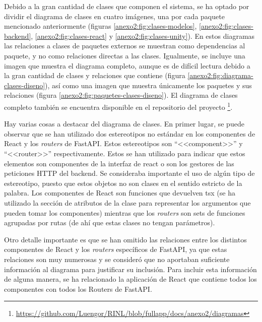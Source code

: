 Debido a la gran cantidad de clases que componen el sistema, se ha optado por dividir el diagrama
de clases en cuatro imágenes, una por cada paquete mencionado anteriormente (figuras
\ref{anexo2:fig:clases-modelos}, \ref{anexo2:fig:clases-backend},
 \ref{anexo2:fig:clases-react} y \ref{anexo2:fig:clases-unity}). En estos diagramas
las relaciones a clases de paquetes externos se muestran como dependencias al paquete, y no
como relaciones directas a las clases. Igualmente, se incluye una imagen que muestra
el diagrama completo, aunque es de difícil lectura debido a la gran cantidad de clases
y relaciones que contiene (figura \ref{anexo2:fig:diagrama-clases-diseno}), así como
una imagen que muestra únicamente los paquetes y sus relaciones
(figura \ref{anexo2:fig:paquetes-clases-diseno}). El diagrama de clases completo
también se encuentra disponible en el repositorio del proyecto%
\footnote{\url{https://github.com/Luengor/RINL/blob/fullapp/docs/anexo2/diagramas}}.

Hay varias cosas a destacar del diagrama de clases. En primer lugar, se puede observar que se
han utilizado dos estereotipos no estándar en los componentes de React y los \textit{routers} de
FastAPI. Estos estereotipos son \enquote{<<component>>} y \enquote{<<router>>} respectivamente. Estos
se han utilizado para indicar que estos elementos son componentes de la interfaz de react o son los
gestores de las peticiones HTTP del \gls{backend}. Se consideraba importante el uso de algún tipo
de estereotipo, puesto que estos objetos no son clases en el sentido estricto de la palabra. Los
componentes de React son funciones que devuelven \gls{tsx} (se ha utilizado la sección de
atributos de la clase para representar los argumentos que pueden tomar los componentes) mientras
que los \textit{routers} son sets de funciones agrupadas por rutas (de ahí que estas clases no
tengan parámetros).

Otro detalle importante es que se han omitido las relaciones entre los distintos componentes de
React y los \textit{routers} específicos de FastAPI, ya que estas relaciones son muy numerosas y
se consideró que no aportaban suficiente información al diagrama para justificar su inclusión. Para
incluir esta información de alguna manera, se ha relacionado la aplicación de React que contiene
todos los componentes con todos los Routers de FastAPI.



